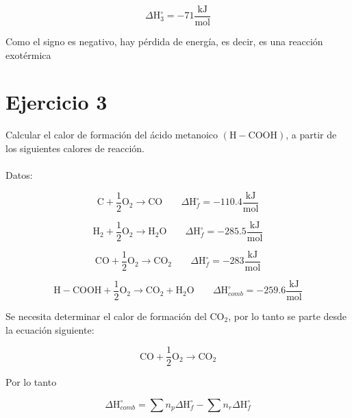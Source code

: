 \documentclass[12pt]{article}
\begin{document}
\begin{displaymath}
	\Delta\mathrm{H}_3^{\circ}=-71\frac{\mathrm{kJ}}{\mathrm{mol}}
\end{displaymath}

Como el signo es negativo, hay pérdida de energía, es decir, es una reacción exotérmica
\newpage
\section*{Ejercicio 3}

Calcular el calor de formación del ácido metanoico $(\mathrm{H}-\mathrm{COOH})$, a partir de los siguientes calores de reacción.\\
\\
Datos:

\begin{displaymath}
	\mathrm{C} + \frac{1}{2}\mathrm{O}_2\rightarrow\mathrm{CO} \;\;\;\;\;\;\; \Delta\mathrm{H}_f^{\circ}=-110.4\frac{\mathrm{kJ}}{\mathrm{mol}}
\end{displaymath}

\begin{displaymath}
	\mathrm{H}_2+\frac{1}{2}\mathrm{O}_2 \rightarrow \mathrm{H}_2\mathrm{O} \;\;\;\;\;\;\; \Delta\mathrm{H}_f^{\circ}=-285.5\frac{\mathrm{kJ}}{\mathrm{mol}}
\end{displaymath}

\begin{displaymath}
	\mathrm{CO} + \frac{1}{2}\mathrm{O}_2 \rightarrow \mathrm{CO}_2 \;\;\;\;\;\;\; 
	\Delta\mathrm{H}_f^{\circ}=-283\frac{\mathrm{kJ}}{\mathrm{mol}}
\end{displaymath}

\begin{displaymath}
	\mathrm{H}-\mathrm{COOH}+\frac{1}{2}\mathrm{O}_2 \rightarrow \mathrm{CO}_2 + \mathrm{H}_2\mathrm{O} \;\;\;\;\;\;\; \Delta\mathrm{H}_{comb}^{\circ}=-259.6\frac{\mathrm{kJ}}{\mathrm{mol}}
\end{displaymath}

Se necesita determinar el calor de formación del $\mathrm{CO}_2$, por lo tanto se parte desde la ecuación siguiente:

\begin{displaymath}
		\mathrm{CO} + \frac{1}{2}\mathrm{O}_2 \rightarrow \mathrm{CO}_2
\end{displaymath}

Por lo tanto

\begin{displaymath}
	\Delta\mathrm{H}_{comb}^{\circ}=\sum n_p\Delta\mathrm{H}_f^{\circ}-\sum n_r\Delta\mathrm{H}_f^{\circ}
\end{displaymath}
\end{document}
